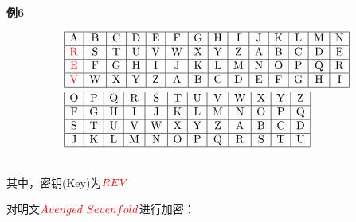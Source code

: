 \documentclass{article}
\begin{document}
~\\

\textbf{例6}

$$
\begin{aligned}
&\begin{array}{|c|c|c|c|c|c|c|c|c|c|c|c|c|c|}
\hline \mathrm{A} & \mathrm{B} & \mathrm{C} & \mathrm{D} & \mathrm{E} & \mathrm{F} & \mathrm{G} & \mathrm{H} & \mathrm{I} & \mathrm{J} & \mathrm{K} & \mathrm{L} & \mathrm{M} & \mathrm{N} \\
\hline \mathrm{\color{red}R} & \mathrm{S} & \mathrm{T} & \mathrm{U} & \mathrm{V} & \mathrm{W} & \mathrm{X} & \mathrm{Y} & \mathrm{Z} & \mathrm{A} & \mathrm{B} & \mathrm{C} & \mathrm{D} & \mathrm{E} \\
\hline \mathrm{\color{red}E} & \mathrm{F} & \mathrm{G} & \mathrm{H} & \mathrm{I} & \mathrm{J} & \mathrm{K} & \mathrm{L} & \mathrm{M} & \mathrm{N} & \mathrm{O} & \mathrm{P} & \mathrm{Q} & \mathrm{R} \\
\hline \mathrm{\color{red}V} & \mathrm{W} & \mathrm{X} & \mathrm{Y} & \mathrm{Z} & \mathrm{A} & \mathrm{B} & \mathrm{C} & \mathrm{D} & \mathrm{E} & \mathrm{F} & \mathrm{G} & \mathrm{H} & \mathrm{I} \\
\hline
\end{array}\\
&\begin{array}{|c|c|c|c|c|c|c|c|c|c|c|c|}
\hline \mathrm{O} & \mathrm{P} & \mathrm{Q} & \mathrm{R} & \mathrm{S} & \mathrm{T} & \mathrm{U} & \mathrm{V} & \mathrm{W} & \mathrm{X} & \mathrm{Y} & \mathrm{Z} \\
\hline \mathrm{F} & \mathrm{G} & \mathrm{H} & \mathrm{I} & \mathrm{J} & \mathrm{K} & \mathrm{L} & \mathrm{M} & \mathrm{N} & \mathrm{O} & \mathrm{P} & \mathrm{Q} \\
\hline \mathrm{S} & \mathrm{T} & \mathrm{U} & \mathrm{V} & \mathrm{W} & \mathrm{X} & \mathrm{Y} & \mathrm{Z} & \mathrm{A} & \mathrm{B} & \mathrm{C} & \mathrm{D} \\
\hline \mathrm{J} & \mathrm{K} & \mathrm{L} & \mathrm{M} & \mathrm{N} & \mathrm{O} & \mathrm{P} & \mathrm{Q} & \mathrm{R} & \mathrm{S} & \mathrm{T} & \mathrm{U} \\
\hline
\end{array}
\end{aligned}
$$

~\\

其中，密钥(Key)为${\color{red}REV}$

对明文${\color{red}Avenged\ Sevenfold}$进行加密：
\end{document}
